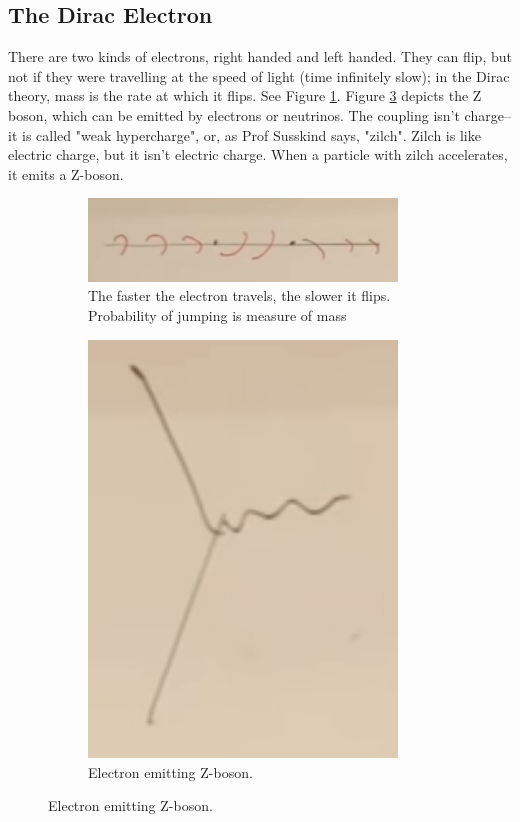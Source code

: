 \documentclass[]{article}
\begin{document}
\begin{appendices}
	\subsection{The Dirac Electron}
	
	There are two kinds of electrons, right handed and left handed. They can flip, but not if they were travelling at the speed of light (time infinitely slow); in the Dirac theory, mass is the rate at which it flips. See Figure \ref{fig:2-a3-flipping-electron}. Figure \ref{fig:2-a3-Z-boson} depicts the Z boson, which can be emitted by electrons or neutrinos. The coupling isn't charge--it is called "weak hypercharge", or, as Prof Susskind says, "zilch". Zilch is like electric charge, but it isn't electric charge. When a particle with zilch accelerates, it emits a Z-boson.
	
	\begin{figure}[H]
	\caption{Electron flipping between left and right}
		\begin{subfigure}[t]{0.65\textwidth}
			\caption{The faster the electron travels, the slower it flips. Probability of jumping is measure of mass}\label{fig:2-a3-flipping-electron}
			\includegraphics[width=0.9\textwidth]{2-a3-flipping-electron}
		\end{subfigure}
		\begin{subfigure}[t]{0.3\textwidth}
			\caption{Electron emitting Z-boson. }\label{fig:2-a3-Z-boson}
			\includegraphics[width=0.9\textwidth]{2-a3-Z-boson}

\end{subfigure}
\end{figure}
\end{appendices}
\end{document}
